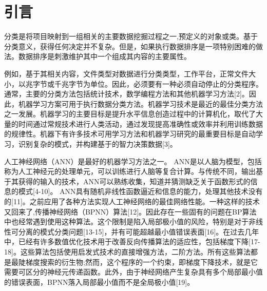 
\chapter{引言}
\label{chap:introduction}


分类是将项目映射到一组相关的主要数据挖掘过程之一,预定义的对象或类。基于分类意义，获得任何决定并不复杂。但是，如果执行数据排序是一项特别困难的做法。数据排序是刺激维护其中一个组成其内容的主要属性。


例如，基于其相关内容，文件类型对数据进行分类类型，工作平台，正常文件大小，以兆字节或千兆字节为单位。因此，必须要有一种必须自动停止的分类程序。通常，主要的分类方法包括统计技术，数学编程方法和其他机器学习方法[2]。因此，机器学习方案可用于执行数据分类方法。机器学习技术是最近的最佳分类方法之一发展。机器学习的主要目标是提升水平信息创造过程中的计算机化，取代了大量的时间通过常规技术进行人类活动，通过发现提高准确性或效率并利用训练数据的规律性。机器下有许多技术可用学习方法和机器学习研究的最重要目标是自动学习，识别复杂的模式，并构建基于的智力决策数据[3]。


人工神经网络（ANN）是最好的机器学习方法之一。 ANN是以人脑为模型，包括称为人工神经元的处理单元，可以训练进行人脑等复合计算。与传统不同，输出基于其获得的输入的技术，ANN可以熟练收集，知道并猜测缺乏关于函数形式的信息的模式[4-10]。
ANN具有随机非线性函数逼近和信息的能力，处理其他技术没有的[11]。之前应用了各种方法实现人工神经网络的最佳网络性能。一种这样的技术又回来了,传播神经网络（BPNN）算法[12]。因此存在一些固有的问题在BP算法中也经常遇到使用这种算法。这个限制是陷入局部极小值的风险，特别是对于非线性可分离的模式分类问题[13-15]，并有可能超越最小值错误表面[16]。在过去几年中，已经有许多数值优化技术用于改善反向传播算法的适应性，包括梯度下降[17-18]。这些算法包括使用启发式技术的直接增强方法，二阶方法。所有这些算法都是最陡梯度搜索的衍生物;然而，这个程序的一个约束，即梯度下降技术，就是它
需要可区分的神经元传递函数。此外，由于神经网络产生复杂具有多个局部最小值的错误表面，BPNN落入局部最小值而不是全局极小值[19]。


